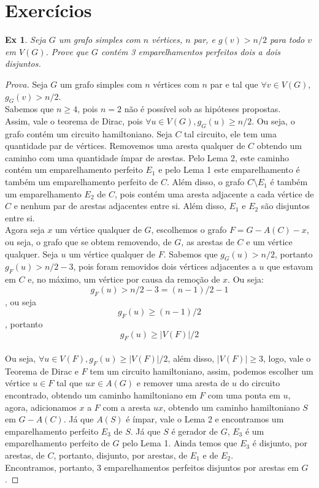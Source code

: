 \documentclass[12pt]{article}
\newcounter{exCounter}
\newtheorem{ex}[exCounter]{Ex}
\begin{document}
\section{Exercícios}
\begin{ex}
Seja $G$ um grafo simples com $n$ vértices, $n$ par, e $g(v) > n/2$ para todo $v$ em $V(G)$. Prove que $G$ contém 3 emparelhamentos perfeitos dois a dois disjuntos.
\end{ex}

\begin{proof}[Prova]
Seja $G$ um grafo simples com $n$ vértices com $n$ par e tal que $\forall v \in V(G)$, $g_G(v) > n/2$. \\
Sabemos que $n \geq 4$, pois $n = 2$ não é possível sob as hipóteses propostas. \\
Assim, vale o teorema de Dirac, pois $\forall u \in V(G), g_G(u) \geq n/2$. Ou seja, o grafo contém um circuito hamiltoniano. Seja $C$ tal circuito, ele tem uma quantidade par de vértices. Removemos uma aresta qualquer de $C$ obtendo um caminho com uma quantidade ímpar de arestas. Pelo Lema 2, este caminho contém um emparelhamento perfeito $E_1$ e pelo Lema 1 este emparelhamento é também um emparelhamento perfeito de $C$. Além disso, o grafo $C \setminus E_1$ é também um emparelhamento $E_2$ de $C$, pois contém uma aresta adjacente a cada vértice de $C$ e nenhum par de arestas adjacentes entre si. Além disso, $E_1$ e $E_2$ são disjuntos entre si. \\
Agora seja $x$ um vértice qualquer de $G$, escolhemos o grafo $F = G - A(C) - x$, ou seja, o grafo que se obtem removendo, de $G$, as arestas de $C$ e um vértice qualquer. Seja $u$ um vértice qualquer de $F$. Sabemos que $g_G(u) > n/2$, portanto $g_F(u) > n/2 - 3$, pois foram removidos dois vértices adjacentes a $u$ que estavam em $C$ e, no máximo, um vértice por causa da remoção de $x$. Ou seja:
$$g_F(u) > n/2 - 3 = (n-1)/2 - 1$$, ou seja
$$g_F(u) \geq (n-1)/2$$, portanto
$$g_F(u) \geq |V(F)|/2$$ \\
Ou seja, $\forall u \in V(F), g_F(u) \geq |V(F)|/2$, além disso, $|V(F)| \geq 3$, logo, vale o Teorema de Dirac e $F$ tem um circuito hamiltoniano, assim, podemos escolher um vértice $u \in F$ tal que $ux \in A(G)$ e remover uma aresta de $u$ do circuito encontrado, obtendo um caminho hamiltoniano em $F$ com uma ponta em $u$, agora, adicionamos $x$ a $F$ com a aresta $ux$, obtendo um caminho hamiltoniano $S$ em $G-A(C)$. Já que $A(S)$ é ímpar, vale o Lema 2 e encontramos um emparelhamento perfeito $E_3$ de $S$. Já que $S$ é gerador de $G$, $E_3$ é um emparelhamento perfeito de $G$ pelo Lema 1. Ainda temos que $E_3$ é disjunto, por arestas, de $C$, portanto, disjunto, por arestas, de $E_1$ e de $E_2$. \\
Encontramos, portanto, 3 emparelhamentos perfeitos disjuntos por arestas em $G$.
\end{proof}
\end{document}
